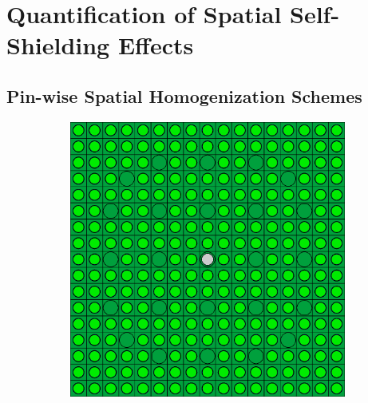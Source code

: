 \chapter{Quantification of Spatial Self-Shielding Effects}
\label{chap:quantify}


\section{Pin-wise Spatial Homogenization Schemes}
\label{sec:chap8-pinwise-space-homogenize}

\begin{figure}[h!]
\centering
\begin{subfigure}{.5\textwidth}
  \centering
  \includegraphics[width=0.9\linewidth]{figures/quantification/homogenization/assm-16-null-materials}
  \caption{}
  \label{fig:chap8-assm-16-null-materials}
\end{subfigure}%
\begin{subfigure}{.5\textwidth}
  \centering

\end{subfigure}
\end{figure}
